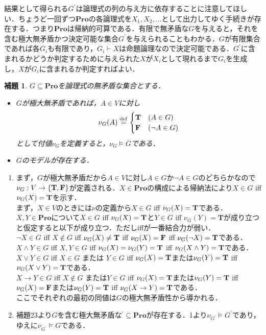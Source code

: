 \documentclass{ltjsarticle}
\makeatletter
\theoremstyle{mystyle1}
\theoremstyle{mystyle3}
\newtheorem{lem}[cor]{補題}
\theoremstyle{mystyle2}
\renewenvironment{proof}[1][\proofname]{\par
  \pushQED{\qed}%
  \normalfont
  \topsep6\p@\@plus6\p@ \trivlist
  \item[\hskip\labelsep{\bfseries\sffamily #1}]\ignorespaces
}{%
  \popQED\endtrivlist\@endpefalse
}
\renewcommand\proofname{証明:}
\newcommand{\bT}{\ensuremath{\mathbf{T}}}
\newcommand{\bF}{\ensuremath{\mathbf{F}}}
\newcommand{\bPro}{\ensuremath{\mathbf{Pro}}}
\newcommand{\dequal}{\ensuremath{\stackrel{\rm{def}}{=}}}
\makeatother
\begin{document}
結果として得られる$G^\prime$は論理式の列の与え方に依存することに注意してほしい．ちょうど一回ずつ\bPro の各論理式を$X_1, X_2, \ldots$として出力してゆく手続きが存在する．つまり\bPro は帰納的可算である．有限で無矛盾な$G$を与えると，それを含む極大無矛盾かつ決定可能な集合$G^\prime$を与えられることもわかる．$G$が有限集合であれば各$G_i$も有限であり，$G_i\vdash X$は命題論理なので決定可能である．$G^\prime$に含まれるかどうか判定するために与えられた$X$が$X_i$として現れるまで$G_i$を生成し，$X$が$G_i$に含まれるか判定すればよい．
\begin{lem}
  $G\subseteq\bPro$を論理式の無矛盾な集合とする．
  \begin{itemize}
    \item $G$が極大無矛盾であれば，$A\in V$に対し
    \[\nu_G\qty(A)\dequal\begin{cases}
      \bT&\qty(A\in G)\\
      \bF&\qty(\neg A\in G)
    \end{cases}\]
    として付値$\nu_G$を定義すると，$\nu_G\models G$である．
    \item $G$のモデルが存在する．
    \end{itemize}
\end{lem}
\begin{proof}
  \begin{enumerate}
    \item まず，$G$が極大無矛盾だから$A\in V$に対し$A\in G$か$\neg A\in G$のどちらかなので$\nu_G:V \to \qty{\bT, \bF}$が定義される．$X\in\bPro$の構成による帰納法により$X\in G$ iff $\nu_G\qty(X)=\bT$を示す．\\まず，$X\in V$のときには$\nu$の定義から$X\in G$ iff $\nu_G\qty(X) = \bT$である．$X,Y \in\bPro$について$X\in G$ iff $\nu_G\qty(X) = \bT$と$Y\in G$ iff $\nu_G(Y) = \bT$が成り立つと仮定すると以下が成り立つ．ただしiffが一番結合力が弱い．\\$\neg X\in G$ iff $X\not\in G$ iff $\nu_G\qty(X) \neq \bT$ iff $\nu_G\qty(X) = \bF$ iff $\nu_G\qty(\neg X) = \bT$である． \\$X\wedge Y\in G$ iff $X,Y \in G$ iff $\nu_G\qty(X) = \nu_G\qty(Y) = \bT$ iff $\nu_G\qty(X\wedge Y) = \bT$である．\\$X\vee Y\in G$ iff $X\in G$ または $Y\in G$ iff $\nu_G\qty(X) =\bT$または$\nu_G\qty(Y) = \bT$ iff $\nu_G\qty(X\vee Y) = \bT$である．\\$X\to Y\in G$ iff $X\not\in G$ または$Y\in G$ iff $\nu_G\qty(X) = \bT$または$\nu_G\qty(Y) = \bT$ iff $\nu_G\qty(X) = \bF$または$\nu_G\qty(Y) = \bT$ iff $\nu_G\qty(X\to Y) = \bT$である．\\ここでそれぞれの最初の同値は$G$の極大無矛盾性から導かれる．
    \item 補題23より$G$を含む極大無矛盾な$^\prime\subseteq\bPro$が存在する．1より$\nu_{G^\prime}\models G^\prime$であり，ゆえに$\nu_{G^\prime}\models G$である．
  \end{enumerate}
\end{proof}
\end{document}
